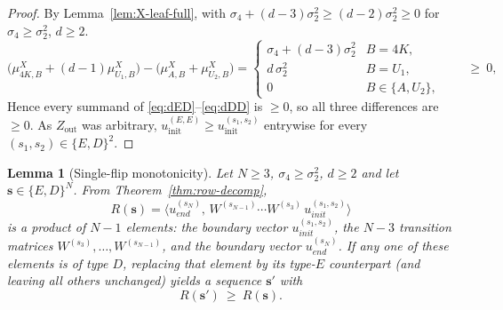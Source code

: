 \documentclass[12pt,a4paper]{article}
\newtheorem{lemma}[theorem]{Lemma}
\begin{document}
\begin{proof}
By Lemma~\ref{lem:X-leaf-full}, with $\sigma_4+(d-3)\sigma_2^2\ge(d-2)\sigma_2^2\ge0$
for $\sigma_4\ge\sigma_2^2$, $d\ge2$.
\[
\bigl(\mu^X_{4K,B}+(d-1)\mu^X_{U_1,B}\bigr)-\bigl(\mu^X_{A,B}+\mu^X_{U_2,B}\bigr)
=
\begin{cases}
\sigma_4+(d-3)\sigma_2^2 & B=4K,\\
d\,\sigma_2^2            & B=U_1,\\
0                       & B\in\{A,U_2\},
\end{cases}
\qquad\ge\ 0,
\]
 Hence every summand of
\eqref{eq:dED}--\eqref{eq:dDD} is $\ge0$, so all three differences are $\ge0$. As
$Z_\mathrm{out}$ was arbitrary, $u_\mathrm{init}^{(E,E)}\ge u_\mathrm{init}^{(s_1,s_2)}$
entrywise for every $(s_1,s_2)\in\{E,D\}^2$.
\end{proof}

\begin{lemma}[Single-flip monotonicity]\label{lem:flip}
Let $N\ge3$, $\sigma_4\ge\sigma_2^2$, $d\ge2$ and let $\mathbf{s}\in\{E,D\}^N$.
From Theorem~\ref{thm:row-decomp},
\[
R(\mathbf{s})=\bigl\langle u_{end}^{(s_N)},\,W^{(s_{N-1})}\cdots W^{(s_3)}\,u_{init}^{(s_1,s_2)}\bigr\rangle
\]
is a product of $N-1$ elements: the boundary vector $u_{init}^{(s_1,s_2)}$, the $N-3$ transition matrices $W^{(s_3)},\dots,W^{(s_{N-1})}$, and the boundary vector $u_{end}^{(s_N)}$. If any one of these elements is of type $D$, replacing that element by its type-$E$ counterpart (and leaving all others unchanged) yields a sequence
$\mathbf{s}'$ with
\[
R(\mathbf{s}')\ \ge\ R(\mathbf{s}).
\]
\end{lemma}
\end{document}
